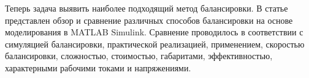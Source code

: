 Теперь задача выявить наиболее подходящий метод балансировки.
В статье \cite{daowd2011passive} представлен обзор и сравнение различных способов 
балансировки на основе моделирования в MATLAB Simulink. 
Сравнение проводилось в соответствии с симуляцией балансировки, 
практической реализацией, применением, скоростью балансировки, сложностью, стоимостью, габаритами, 
эффективностью, характерными рабочими токами и напряжениями.
